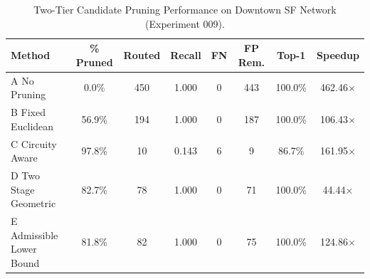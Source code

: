 \begin{table}[htbp]
\centering
\small
\caption{Two-Tier Candidate Pruning Performance on Downtown SF Network (Experiment 009).}
\label{tab:pruning_comparison}
\begin{tabular}{l c c c c c c c}
\toprule
\textbf{Method} & \textbf{\% Pruned} & \textbf{Routed} & \textbf{Recall} & \textbf{FN} & \textbf{FP Rem.} & \textbf{Top-1} & \textbf{Speedup} \\
\midrule
A No Pruning & 0.0\% & 450 & 1.000 & 0 & 443 & 100.0\% & 462.46$\times$ \\
B Fixed Euclidean & 56.9\% & 194 & 1.000 & 0 & 187 & 100.0\% & 106.43$\times$ \\
C Circuity Aware & 97.8\% & 10 & 0.143 & 6 & 9 & 86.7\% & 161.95$\times$ \\
D Two Stage Geometric & 82.7\% & 78 & 1.000 & 0 & 71 & 100.0\% & 44.44$\times$ \\
E Admissible Lower Bound & 81.8\% & 82 & 1.000 & 0 & 75 & 100.0\% & 124.86$\times$ \\
\bottomrule
\end{tabular}
\end{table}
